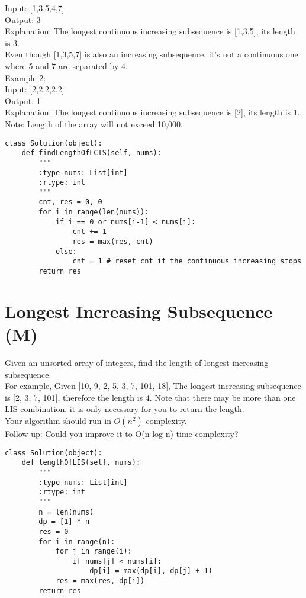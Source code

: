 Input: [1,3,5,4,7]\\
Output: 3\\
Explanation: The longest continuous increasing subsequence is [1,3,5], its length is 3. \\
Even though [1,3,5,7] is also an increasing subsequence, it's not a continuous one where 5 and 7 are separated by 4. \\

Example 2:\\

Input: [2,2,2,2,2]\\
Output: 1\\
Explanation: The longest continuous increasing subsequence is [2], its length is 1. \\

Note: Length of the array will not exceed 10,000. \\
\begin{lstlisting}
class Solution(object):
    def findLengthOfLCIS(self, nums):
        """
        :type nums: List[int]
        :rtype: int
        """
        cnt, res = 0, 0
        for i in range(len(nums)):
            if i == 0 or nums[i-1] < nums[i]:
                cnt += 1
                res = max(res, cnt)
            else:
                cnt = 1 # reset cnt if the continuous increasing stops
        return res
\end{lstlisting}

\section{Longest Increasing Subsequence (M)}
Given an unsorted array of integers, find the length of longest increasing subsequence.\\

For example,
Given [10, 9, 2, 5, 3, 7, 101, 18],
The longest increasing subsequence is [2, 3, 7, 101], therefore the length is 4. Note that there may be more than one LIS combination, it is only necessary for you to return the length.\\

Your algorithm should run in $O(n^2)$ complexity.\\

Follow up: Could you improve it to O(n log n) time complexity? \\

\begin{lstlisting}
class Solution(object):
    def lengthOfLIS(self, nums):
        """
        :type nums: List[int]
        :rtype: int
        """
        n = len(nums)
        dp = [1] * n
        res = 0
        for i in range(n):
            for j in range(i):
                if nums[j] < nums[i]:
                    dp[i] = max(dp[i], dp[j] + 1)
            res = max(res, dp[i])
        return res
\end{lstlisting}

